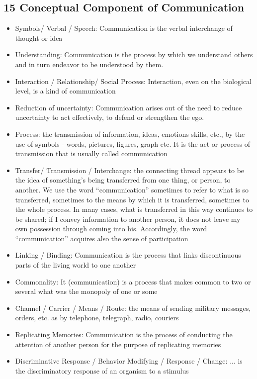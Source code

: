 \subsection{15 Conceptual Component of Communication}
    \begin{itemize}
        \item Symbols/ Verbal / Speech: Communication is the verbal interchange of thought or idea
        \item Understanding: Communication is the process by which we understand others and in turn endeavor to be understood by them.
        \item Interaction / Relationship/ Social Process: Interaction, even on the biological level, is a kind of communication 
        \item Reduction of uncertainty: Communication arises out of the need to reduce uncertainty to act effectively, to defend or strengthen the ego. 
        \item Process: the transmission of information, ideas, emotions skills, etc., by the use of symbols - words, pictures, figures, graph etc. It is the act or process of transmission that is usually called communication 
        \item Transfer/ Transmission / Interchange: the connecting thread appears to be the idea of something’s being transferred from one thing, or person, to another. We use the word “communication” sometimes to refer to what is so transferred, sometimes to the means by which it is transferred, sometimes to the whole process. In many cases, what is transferred in this way continues to be shared; if I convey information to another person, it docs not leave my own possession through coming into his. Accordingly, the word “communication” acquires also the sense of participation
        \item Linking / Binding: Communication is the process that links discontinuous parts of the living world to one another
        \item Commonality: It (communication) is a process that makes common to two or several what was the monopoly of one or some
        \item Channel / Carrier / Means / Route: the means of sending military messages, orders, etc. as by telephone, telegraph, radio, couriers
        \item Replicating Memories: Communication is the process of conducting the attention of another person for the purpose of replicating memories
        \item Discriminative Response / Behavior Modifying / Response / Change: ... is the discriminatory response of an organism to a stimulus 

\end{itemize}

